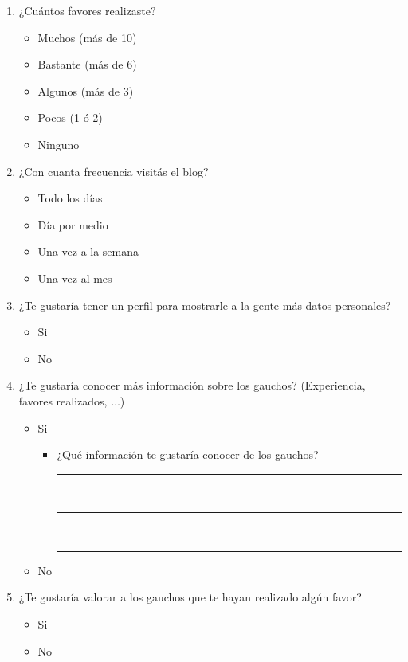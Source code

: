 \documentclass[a4paper,10pt]{article}
\begin{document}
\begin{enumerate}
    \item ¿Cuántos favores realizaste?
    \begin{itemize}
        \item Muchos (más de 10)
        \item Bastante (más de 6)
        \item Algunos (más de 3)
        \item Pocos (1 ó 2)
        \item Ninguno
    \end{itemize}
    
    \item ¿Con cuanta frecuencia visitás el blog?
    \begin{itemize}
        \item Todo los días
        \item Día por medio
        \item Una vez a la semana
        \item Una vez al mes
    \end{itemize}
    
    \item ¿Te gustaría tener un perfil para mostrarle a la gente más datos personales?
    \begin{itemize}
        \item Si
        \item No
    \end{itemize}
    
    \item ¿Te gustaría conocer más información sobre los gauchos? (Experiencia, favores realizados, $\ldots$)
    \begin{itemize}
        \item Si
        \begin{itemize}
            \item ¿Qué información te gustaría conocer de los gauchos? 
            
            \rule{100mm}{0.1mm} \\
            \rule{100mm}{0.1mm} \\
            \rule{100mm}{0.1mm}
        \end{itemize}
        \item No
    \end{itemize}
    
    \item ¿Te gustaría valorar a los gauchos que te hayan realizado algún favor?
    \begin{itemize}
        \item Si
        \item No
    \end{itemize}
    

\end{enumerate}
\end{document}
